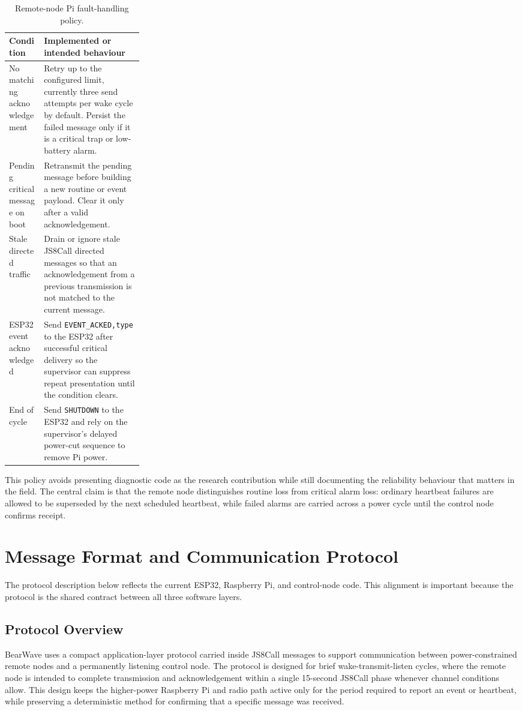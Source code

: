 \documentclass[acmsmall,screen]{acmart}
\begin{document}
\begin{table}[tbp]
\caption{Remote-node Pi fault-handling policy.}
\label{tab:pi-fault-policy}
\begin{tabularx}{\linewidth}{p{0.26\linewidth}X}
\toprule
Condition & Implemented or intended behaviour \\
\midrule
No matching acknowledgement & Retry up to the configured limit, currently three send attempts per wake cycle by default. Persist the failed message only if it is a critical trap or low-battery alarm. \\
Pending critical message on boot & Retransmit the pending message before building a new routine or event payload. Clear it only after a valid acknowledgement. \\
Stale directed traffic & Drain or ignore stale JS8Call directed messages so that an acknowledgement from a previous transmission is not matched to the current message. \\
ESP32 event acknowledged & Send \texttt{EVENT\_ACKED,type} to the ESP32 after successful critical delivery so the supervisor can suppress repeat presentation until the condition clears. \\
End of cycle & Send \texttt{SHUTDOWN} to the ESP32 and rely on the supervisor's delayed power-cut sequence to remove Pi power. \\
\bottomrule
\end{tabularx}
\end{table}

This policy avoids presenting diagnostic code as the research contribution while still documenting the reliability behaviour that matters in the field. The central claim is that the remote node distinguishes routine loss from critical alarm loss: ordinary heartbeat failures are allowed to be superseded by the next scheduled heartbeat, while failed alarms are carried across a power cycle until the control node confirms receipt.

\section{Message Format and Communication Protocol}
The protocol description below reflects the current ESP32, Raspberry Pi, and control-node code. This alignment is important because the protocol is the shared contract between all three software layers.

\subsection{Protocol Overview}
BearWave uses a compact application-layer protocol carried inside JS8Call messages to support communication between power-constrained remote nodes and a permanently listening control node. The protocol is designed for brief wake-transmit-listen cycles, where the remote node is intended to complete transmission and acknowledgement within a single 15-second JS8Call phase whenever channel conditions allow. This design keeps the higher-power Raspberry Pi and radio path active only for the period required to report an event or heartbeat, while preserving a deterministic method for confirming that a specific message was received.
\end{document}

